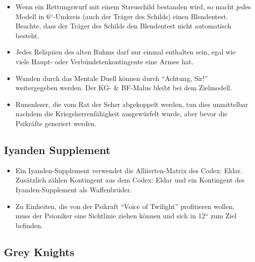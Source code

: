 \begin{itemize}
 \item Wenn ein Rettungswurf mit einem Streuschild bestanden wird, so macht
  jedes Modell in 6“-Umkreis (auch der Träger des Schilds) einen Blendentest.
  Beachte, dass der Träger des Schilds den Blendentest nicht automatisch
  besteht. 

 \item Jedes Reliquien des alten Ruhms darf nur einmal enthalten sein, egal wie
  viele Haupt- oder Verbündetenkontingente eine Armee hat.

 \item Wunden durch das Mentale Duell können durch ``Achtung, Sir!'' weitergegeben
  werden. Der KG- \& BF-Malus bleibt bei dem Zielmodell.

 \item Runenleser, die vom Rat der Seher abgekoppelt werden, tun dies
  unmittelbar nachdem die Kriegsherrenfähigkeit ausgewürfelt wurde, aber bevor
  die Psikräfte generiert werden.

\end{itemize}

\subsection{Iyanden Supplement}

\begin{itemize}

 \item Ein Iyanden-Supplement verwendet die Alliierten-Matrix des Codex: Eldar.
  Zusätzlich zählen Kontingent aus dem Codex: Eldar und ein Kontingent des
  Iyanden-Supplement als Waffenbrüder.

 \item Zu Einheiten, die von der Psikraft ``Voice of Twilight'' profitieren
  wollen, muss der Psioniker eine Sichtlinie ziehen können und sich in 12“ zum
  Ziel befinden.

\end{itemize}

\subsection{Grey Knights}

